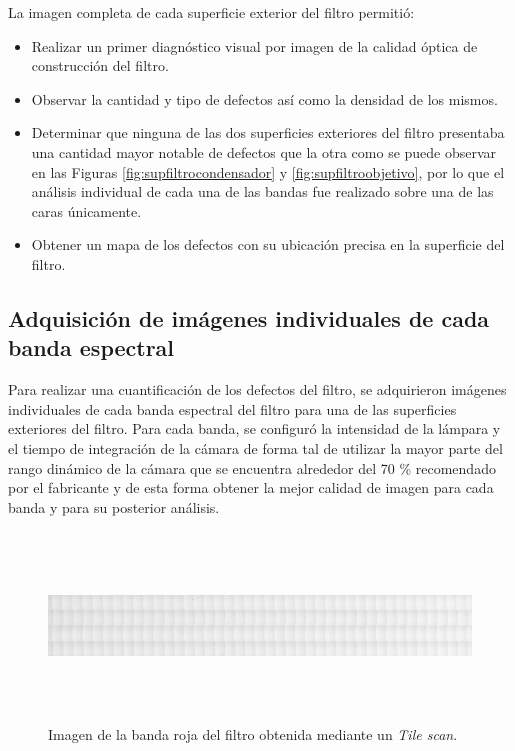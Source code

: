 La imagen completa de cada superficie exterior del filtro permitió:
\begin{itemize}
	\item Realizar un primer diagnóstico visual por imagen de la calidad óptica de construcción del filtro. 
	\item Observar la cantidad y tipo de defectos así como la densidad de los mismos.
	\item Determinar que ninguna de las dos superficies exteriores del filtro presentaba una cantidad mayor notable de defectos que la otra como se puede observar en las Figuras \ref{fig:supfiltrocondensador} y \ref{fig:supfiltroobjetivo}, por lo que el análisis individual de cada una de las bandas fue realizado sobre una de las caras únicamente.
	\item Obtener un mapa de los defectos con su ubicación precisa en la superficie del filtro.
\end{itemize}
\singlespacing
\subsection*{Adquisición de imágenes individuales de cada banda espectral}

\hspace{0.5cm}Para realizar una cuantificación de los defectos del filtro, se adquirieron imágenes individuales de cada banda espectral del filtro para una de las superficies exteriores del filtro. Para cada banda, se configuró la intensidad de la lámpara y el tiempo de integración de la cámara de forma tal de utilizar la mayor parte del rango dinámico de la cámara que se encuentra alrededor del 70 \% recomendado por el fabricante y de esta forma obtener la mejor calidad de imagen para cada banda y para su posterior análisis. 

\begin{figure}[!h]
	\centering
	\includegraphics[width=1.0\textwidth,height= 5.0cm]{Figs/defectosZEISS/tilebandaroja.png}
	\caption{Imagen de la banda roja del filtro obtenida mediante un \textit{Tile scan}.}
	\label{fig:tilebandaroja}
\end{figure}

